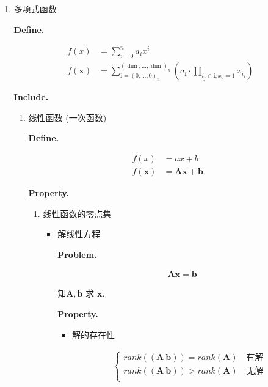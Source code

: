 \documentclass{article}
\title{}\date{} \linespread{1}
\begin{document}
\par
\begin{enumerate}\par
\item 多项式函数\par
	\textbf{Define. }\par
		\begin{align*}
f\left(x\right) &= \sum\limits_{i=0}^{n} a_i x^i  \tag{一元}\\
f\left(\boldsymbol x\right) &= \sum\limits_{\boldsymbol i=\left(0,...,0\right)_n}^{\left(\dim,...,\dim\right)_n} \left(a_{\boldsymbol i} · \prod\limits_{i_j \in \boldsymbol i, x_0 = 1}x_{i_j}\right)
\end{align*}

	\textbf{Include. }\par
		\begin{enumerate}\par
		\item 线性函数 (一次函数)\par
			\textbf{Define. }\par
				\begin{align*}
f\left(x\right) &= a x + b \tag{一元一次}\\
f\left(\boldsymbol x\right) &= \boldsymbol A \boldsymbol x + \boldsymbol b  \tag{多元一次}
\end{align*}

			\textbf{Property. }\par
				\begin{enumerate}\par
				\item 线性函数的零点集\par
					\begin{itemize}
					\item 解线性方程\par
						\textbf{Problem. }\par
							\begin{align*}\boldsymbol A \boldsymbol x = \boldsymbol b\end{align*}

							知$\boldsymbol A, \boldsymbol b$ 求 $\boldsymbol x$.\par
						\textbf{Property. }\par
							\begin{itemize}
							\item 解的存在性\par
								\begin{align*}
\left\{\begin{matrix}
rank\left(\left(\boldsymbol A\ \boldsymbol b\right)\right) = rank\left(\boldsymbol A\right) \quad \text{有解}\\
rank\left(\left(\boldsymbol A\ \boldsymbol b\right)\right) > rank\left(\boldsymbol A\right) \quad \text{无解}\\
\end{matrix}\right.
\end{align*}


\end{itemize}
\end{itemize}
\end{enumerate}
\end{enumerate}
\end{enumerate}
\end{document}
